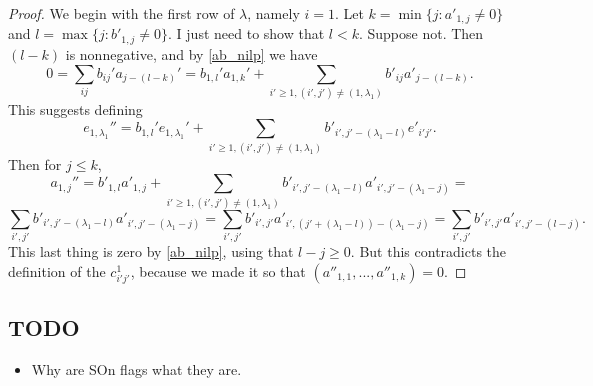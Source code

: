 \documentclass[12pt,psamsfonts]{article}
\begin{document}
\begin{proof}
    We begin with the first row of \(\lambda\), namely \(i = 1\).
    Let \(k = \min\{j : a'_{1,j} \neq 0\}\) and \(l = \max\{j : b'_{1, j} \neq 0\}\).
    I just need to show that \(l < k\).
    Suppose not.
    Then \((l - k)\) is nonnegative, and by \cref{ab_nilp} we have 
    \[0 = \sum_{ij} b_{ij}' a_{j - (l - k)}' = b_{1,l}' a_{1,k}' + \sum_{i' \geq 1, (i', j') \neq (1, \lambda_1)} b'_{ij} a'_{j - (l - k)}.\]
    This suggests defining 
    \[e_{1,\lambda_1}'' = b_{1, l}'e_{1, \lambda_1}' + \sum_{i' \geq 1, (i', j') \neq (1, \lambda_1)} b'_{i',j' - (\lambda_1 - l)} e'_{i'j'}.\]
    Then for \(j \leq k\),
    \[a_{1,j}'' = b'_{1, l} a'_{1, j} + \sum_{i' \geq 1, (i', j') \neq (1, \lambda_1)} b'_{i', j' - (\lambda_1 - l)} a'_{i', j' - (\lambda_1 - j)} = \]
    \[\sum_{i', j'} b'_{i', j' - (\lambda_1 - l)} a'_{i', j' - (\lambda_1 - j)} = \sum_{i', j'} b'_{i', j'} a'_{i', (j' + (\lambda_1 - l)) - (\lambda_1 - j)} = \sum_{i',j'} b'_{i',j'} a'_{i', j' - (l - j)}.\]
    This last thing is zero by \cref{ab_nilp}, using that \(l - j \geq 0\).
    But this contradicts the definition of the \(c_{i'j'}^1\), because we made it so that \((a''_{1, 1}, ..., a''_{1, k}) = 0\).
    
\end{proof}

\subsection{TODO}
\begin{itemize}
    \item Why are SOn flags what they are.
\end{itemize}


\end{document}
